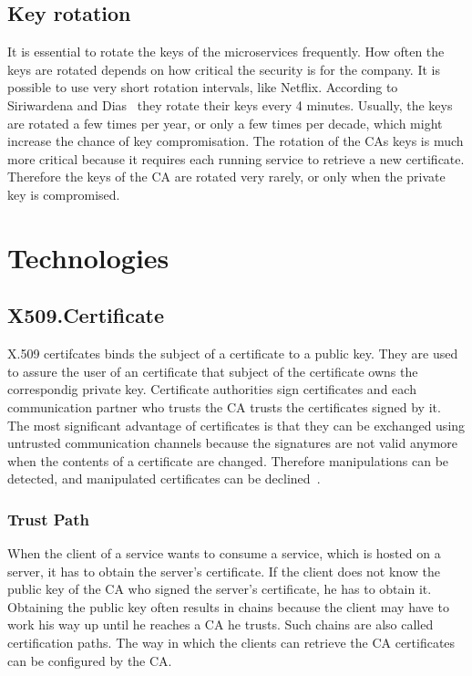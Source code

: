 \subsection{Key rotation}
It is essential to rotate the keys of the microservices frequently. How often the keys are rotated depends on how critical the security is for the company. It is possible to use very short rotation intervals, like Netflix. According to Siriwardena and Dias~\cite{dias2020microservices} they rotate their keys every 4 minutes. Usually, the keys are rotated a few times per year, or only a few times per decade, which might increase the chance of key compromisation. The rotation of the CAs keys is much more critical because it requires each running service to retrieve a new certificate. Therefore the keys of the CA are rotated very rarely, or only when the private key is compromised.

\section{Technologies}
\subsection{X509.Certificate}
X.509 certifcates binds the subject of a certificate to a public key.
They are used to assure the user of an certificate that subject of the certificate owns the correspondig private key.
Certificate authorities sign certificates and each communication partner who trusts the CA trusts the certificates signed by it.
The most significant advantage of certificates is that they can be exchanged using untrusted communication channels because the signatures are not valid anymore when the contents of a certificate are changed.
Therefore manipulations can be detected, and manipulated certificates can be declined~\cite{x509rfc}.

\subsubsection{Trust Path}
When the client of a service wants to consume a service, which is hosted on a server, it has to obtain the server's certificate.
If the client does not know the public key of the CA who signed the server's certificate, he has to obtain it.
Obtaining the public key often results in chains because the client may have to work his way up until he reaches a CA he trusts.
Such chains are also called certification paths.
The way in which the clients can retrieve the CA certificates can be configured by the CA.

